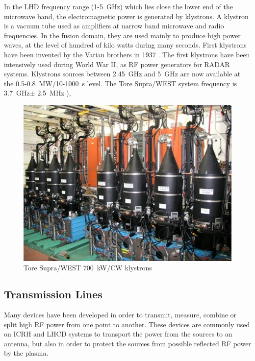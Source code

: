 In the LHD frequency range (1-5~\si{GHz}) which lies close the lower end of the microwave band, the electromagnetic power is generated by klystrons. A klystron is a vacuum tube used as amplifiers at narrow band microwave and radio frequencies. In the fusion domain, they are used mainly to produce high power waves, at the level of hundred of kilo watts during many seconds. First klystrons have been invented by the Varian brothers in 1937 . The first klystrons have been intensively used during World War II, as RF power generators for RADAR systems. Klystrons sources between 2.45~\si{GHz} and 5~\si{GHz} are now available at the 0.5-0.8~\si{MW}/10-1000~\si{s} level. The Tore Supra/WEST system frequency is 3.7~\si{GHz}$\pm$ 2.5~\si{MHz} ),

\begin{figure}[h]
	\centering
	\includegraphics[width=0.7\linewidth]{figures/chap1/ToreSupra_LHCD_klystrons}
	\caption{Tore Supra/WEST 700~kW/CW klystrons}
	\label{fig:toresupralhcdklystrons}
\end{figure}


\subsection{Transmission Lines}
Many devices have been developed in order to transmit, measure, combine or split high RF power from one point to another. These devices are commonly used on ICRH and LHCD systems to transport the power from the sources to an antenna, but also in order to protect the sources from possible reflected RF power by the plasma.  


